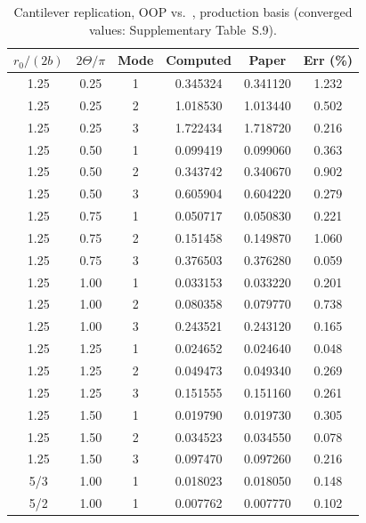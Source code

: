 \documentclass[11pt]{article}
\begin{document}
\begin{table}[!htbp]
\centering
\begin{minipage}[t]{0.43\textwidth}
\centering\scriptsize
\setlength{\tabcolsep}{2.6pt}
\captionsetup{width=\linewidth,justification=raggedright,singlelinecheck=false}
\caption{Cantilever replication, OOP vs.\ \cite{seok1}, production basis (converged values: Supplementary Table~S.9).}
\label{tab:cantilever-oop}
\begin{tabular}{cccccc}
\toprule $r_0/(2b)$ & $2\Theta/\pi$ & Mode & Computed & Paper & Err (\%)\\ \midrule
1.25 & 0.25 & 1 & 0.345324 & 0.341120 & 1.232\\
1.25 & 0.25 & 2 & 1.018530 & 1.013440 & 0.502\\
1.25 & 0.25 & 3 & 1.722434 & 1.718720 & 0.216\\
1.25 & 0.50 & 1 & 0.099419 & 0.099060 & 0.363\\
1.25 & 0.50 & 2 & 0.343742 & 0.340670 & 0.902\\
1.25 & 0.50 & 3 & 0.605904 & 0.604220 & 0.279\\
1.25 & 0.75 & 1 & 0.050717 & 0.050830 & 0.221\\
1.25 & 0.75 & 2 & 0.151458 & 0.149870 & 1.060\\
1.25 & 0.75 & 3 & 0.376503 & 0.376280 & 0.059\\
1.25 & 1.00 & 1 & 0.033153 & 0.033220 & 0.201\\
1.25 & 1.00 & 2 & 0.080358 & 0.079770 & 0.738\\
1.25 & 1.00 & 3 & 0.243521 & 0.243120 & 0.165\\
1.25 & 1.25 & 1 & 0.024652 & 0.024640 & 0.048\\
1.25 & 1.25 & 2 & 0.049473 & 0.049340 & 0.269\\
1.25 & 1.25 & 3 & 0.151555 & 0.151160 & 0.261\\
1.25 & 1.50 & 1 & 0.019790 & 0.019730 & 0.305\\
1.25 & 1.50 & 2 & 0.034523 & 0.034550 & 0.078\\
1.25 & 1.50 & 3 & 0.097470 & 0.097260 & 0.216\\
5/3 & 1.00 & 1 & 0.018023 & 0.018050 & 0.148\\
5/2 & 1.00 & 1 & 0.007762 & 0.007770 & 0.102\\ \bottomrule


\end{tabular}
\end{minipage}
\end{table}
\end{document}
